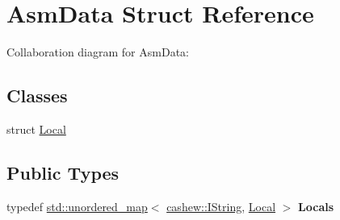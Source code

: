 \hypertarget{struct_asm_data}{}\section{Asm\+Data Struct Reference}
\label{struct_asm_data}


Collaboration diagram for Asm\+Data\+:
\subsection*{Classes}
\begin{DoxyCompactItemize}
\item 
struct \mbox{\hyperlink{struct_asm_data_1_1_local}{Local}}
\end{DoxyCompactItemize}
\subsection*{Public Types}
\begin{DoxyCompactItemize}
\item 
\mbox{\label{struct_asm_data_ac79f513ef5a409d6da59943212efbb9f}} 
typedef \mbox{\hyperlink{classstd_1_1unordered__map}{std\+::unordered\+\_\+map}}$<$ \mbox{\hyperlink{structcashew_1_1_i_string}{cashew\+::\+I\+String}}, \mbox{\hyperlink{struct_asm_data_1_1_local}{Local}} $>$ {\bfseries Locals}
\end{DoxyCompactItemize}
